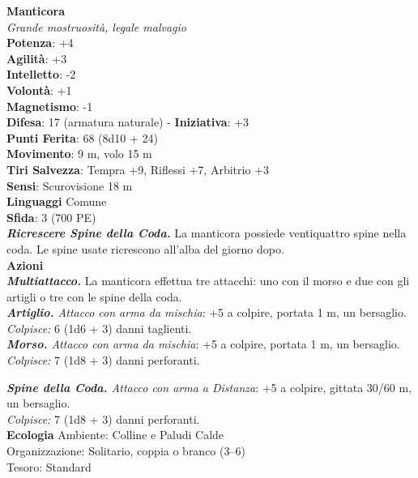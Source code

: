 \begin{multicols}{2}
\medskip\textbf{Manticora}\\
\emph{Grande mostruosità, legale malvagio}\\
\textbf{Potenza}: +4\\
\textbf{Agilità}: +3\\
\textbf{Intelletto}: -2\\
\textbf{Volontà}: +1\\
\textbf{Magnetismo}: -1\\
\textbf{Difesa}: 17 (armatura naturale) - \textbf{Iniziativa}: +3\\
\textbf{Punti Ferita}: 68 (8d10 + 24)\\
\textbf{Movimento}: 9 m, volo 15 m\\
\textbf{Tiri Salvezza}: Tempra +9, Riflessi +7, Arbitrio +3\\
\textbf{Sensi}: Scurovisione 18 m\\
\textbf{Linguaggi} Comune\\
\textbf{Sfida}: 3 (700 PE)\smallskip\\
\emph{\textbf{Ricrescere Spine della Coda.}} La manticora possiede ventiquattro spine nella coda. Le spine usate ricrescono all'alba del giorno dopo.\\

\smallskip\textbf{Azioni}\\

\emph{\textbf{Multiattacco.}} La manticora effettua tre attacchi: uno con il morso e due con gli artigli o tre con le spine della coda.\\

\emph{\textbf{Artiglio.} Attacco con arma da mischia}: +5 a colpire, portata 1 m, un bersaglio.\\

\emph{Colpisce:} 6 (1d6 + 3) danni taglienti.\\

\emph{\textbf{Morso.} Attacco con arma da mischia}: +5 a colpire, portata 1 m, un bersaglio.\\

\emph{Colpisce:} 7 (1d8 + 3) danni perforanti.

\emph{\textbf{Spine della Coda.} Attacco con arma a Distanza}: +5 a colpire, gittata 30/60 m, un bersaglio.\\

\emph{Colpisce:} 7 (1d8 + 3) danni perforanti.\\
\textbf{Ecologia}
Ambiente: Colline e Paludi Calde\\
Organizzazione: Solitario, coppia o branco (3–6)\\
Tesoro: Standard\\


\end{multicols}

